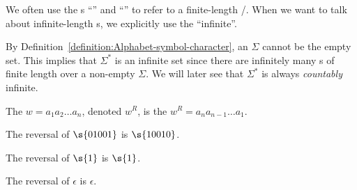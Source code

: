\begin{note} \label{note:Finite-vs-infinite-strings}
We often use the s ``'' and ``'' to refer to a finite-length /. 
When we want to talk about infinite-length s, we explicitly use the  ``infinite''.
\end{note}


\begin{note} \label{note:Size-of-Sigma}
By Definition~\ref{definition:Alphabet-symbol-character}, an  $\Sigma$ cannot be the empty set. 
This implies that $\Sigma^*$ is an infinite set since there are infinitely many s of finite length over a non-empty $\Sigma$. We will later see that $\Sigma^*$ is always \emph{countably} infinite.
\end{note}


\begin{flex}
\begin{definition} \label{definition:Reversal-of-a-string}
The  $w = a_1a_2\ldots a_n$, denoted $w^R$, is the  $w^R = a_na_{n-1}\ldots a_1$.
\end{definition}

\begin{example}[Reversal of $01001$] \label{example:Reversal-of-01001}
The reversal of $\s{01001}$ is $\s{10010}$.
\end{example}

\begin{example}[Reversal of $1$] \label{example:Reversal-of-1}
The reversal of $\s{1}$ is $\s{1}$.
\end{example}

\begin{example} \label{example:Reversal-of-epsilon}
The reversal of $\epsilon$ is $\epsilon$.
\end{example}
\end{flex}


